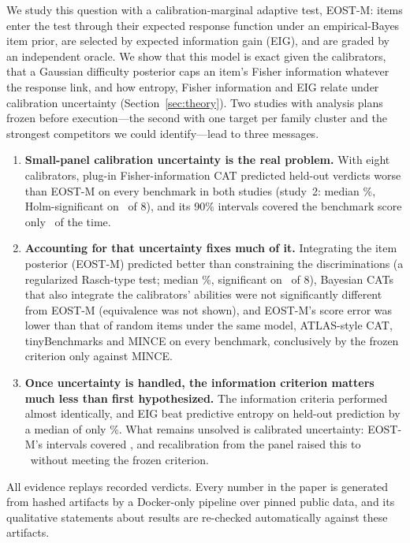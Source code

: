 We study this question with a calibration-marginal adaptive test, EOST-M: items enter the
test through their expected response function under an empirical-Bayes item prior, are
selected by expected information gain (EIG), and are graded by an independent oracle. We
show that this model is exact given the calibrators, that a Gaussian difficulty posterior
caps an item's Fisher information whatever the response link, and how entropy, Fisher
information and EIG relate under calibration uncertainty (Section~\ref{sec:theory}). Two
studies with analysis plans frozen before execution---the second with one target per family
cluster and the strongest competitors we could identify---lead to three messages.
\begin{enumerate}\itemsep1pt
\item \textbf{Small-panel calibration uncertainty is the real problem.} With eight
calibrators, plug-in Fisher-information CAT predicted held-out verdicts worse than EOST-M
on every benchmark in both studies (study~2: median \STwoRTwoMed\%, Holm-significant on
\STwoRTwoFav\ of 8), and its 90\% intervals covered the benchmark score only
\STwoCovmfipi\ of the time.
\item \textbf{Accounting for that uncertainty fixes much of it.} Integrating the item
posterior (EOST-M) predicted better than constraining the discriminations (a regularized
Rasch-type test; median \STwoCOneMed\%, significant on \STwoCOneFav\ of 8), Bayesian CATs that also
integrate the calibrators' abilities were not significantly different from EOST-M (equivalence
was not shown), and EOST-M's score error was lower than that of random items under the same
model, ATLAS-style CAT, tinyBenchmarks and MINCE on every benchmark, conclusively by the frozen
criterion only against MINCE.
\item \textbf{Once uncertainty is handled, the information criterion matters much less than
first hypothesized.} The information criteria performed almost identically, and EIG beat
predictive entropy on held-out prediction by a median of only \MedImpHOne\%. What remains
unsolved is calibrated uncertainty: EOST-M's intervals covered \STwoCoveigmg, and
recalibration from the panel raised this to \STwoCoveigmgRR\ without meeting the frozen
criterion.
\end{enumerate}
All evidence replays recorded verdicts. Every number in the paper is generated from hashed
artifacts by a Docker-only pipeline over pinned public data, and its qualitative statements
about results are re-checked automatically against these artifacts.
